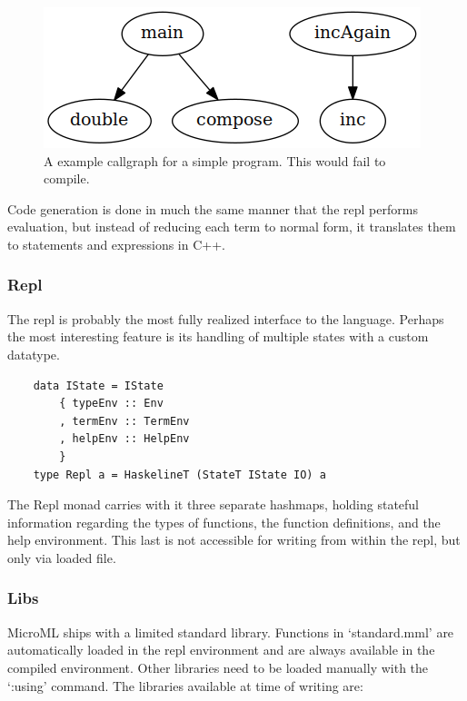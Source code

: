 \documentclass[12pt, a4paper]{report}
\begin{document}
\begin{figure}
    \includegraphics[width=\textwidth]{images/callgraph.png}
    {\caption{A example callgraph for a simple program. This would fail to compile.}}
    \label{fig:callgraph}
\end{figure}

Code generation is done in much the same manner that the repl performs evaluation, but instead of
reducing each term to normal form, it translates them to statements and expressions in C++. 

\subsubsection{Repl}
The repl is probably the most fully realized interface to the language. Perhaps the most interesting
feature is its handling of multiple states with a custom datatype. 

\begin{verbatim}
    data IState = IState
        { typeEnv :: Env
        , termEnv :: TermEnv
        , helpEnv :: HelpEnv
        }
    type Repl a = HaskelineT (StateT IState IO) a
\end{verbatim}

The Repl monad carries with it three separate hashmaps, holding stateful information regarding the
types of functions, the function definitions, and the help environment. This last is not accessible
for writing from within the repl, but only via loaded file.

\subsubsection{Libs}
\label{libs}
MicroML ships with a limited standard library. Functions in `standard.mml' are automatically loaded
in the repl environment and are always available in the compiled environment. Other libraries need
to be loaded manually with the `:using' command. The libraries available at time of writing are:
\end{document}
